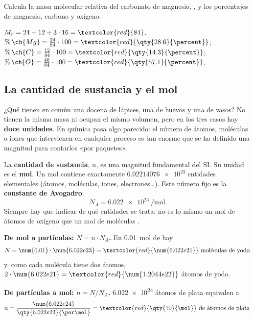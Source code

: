 \begin{exercise}
    Calcula la masa molecular relativa del carbonato de magnesio, , y los porcentajes de magnesio, carbono y oxígeno.
    \begin{solu}
        \(M_r = 24 + 12 + 3 \cdot 16 = \textcolor{red}{84}\).
        \(\%\,\ch{Mg} = \frac{24}{84} \cdot 100 = \textcolor{red}{\qty{28.6}{\percent}}\); \(\%\,\ch{C} = \frac{12}{84} \cdot 100 = \textcolor{red}{\qty{14.3}{\percent}}\); \(\%\,\ch{O} = \frac{48}{84} \cdot 100 = \textcolor{red}{\qty{57.1}{\percent}}\).
    \end{solu}
\end{exercise}

\subsection{La cantidad de sustancia y el mol}

¿Qué tienen en común una docena de lápices, una de huevos y una de vasos? No tienen la misma masa ni ocupan el mismo volumen, pero en los tres casos hay \textbf{doce unidades}. En química pasa algo parecido: el número de átomos, moléculas o iones que intervienen en cualquier proceso es tan enorme que se ha definido una magnitud para contarlos «por paquetes».

\begin{definition}
    La \textbf{cantidad de sustancia}, \(n\), es una magnitud fundamental del SI. Su unidad es el \textbf{mol}. Un mol contiene exactamente \(\num{6.02214076e23}\) entidades elementales (átomos, moléculas, iones, electrones\ldots). Este número fijo es la \textbf{constante de Avogadro}:
    \[ N_A = \qty{6.022e23}{\per\mol} \]
    Siempre hay que indicar de qué entidades se trata: no es lo mismo un mol de átomos de oxígeno que un mol de moléculas .
\end{definition}

\begin{example}
    \textbf{De mol a partículas: \(N = n \cdot N_A\).} En \qty{0.01}{\mol} de  hay
    \[ N = \num{0.01} \cdot \num{6.022e23} = \textcolor{red}{\num{6.022e21}} \text{ moléculas de yodo} \]
    y, como cada molécula tiene dos átomos, \(2 \cdot \num{6.022e21} = \textcolor{red}{\num{1.2044e22}}\) átomos de yodo.

    \textbf{De partículas a mol: \(n = N / N_A\).} \num{6.022e24} átomos de plata equivalen a
    \[ n = \frac{\num{6.022e24}}{\qty{6.022e23}{\per\mol}} = \textcolor{red}{\qty{10}{\mol}} \text{ de átomos de plata} \]
\end{example}

